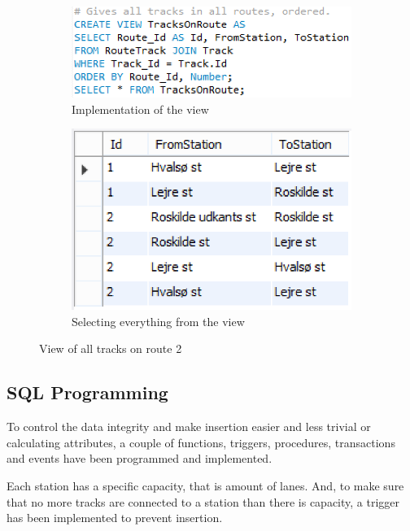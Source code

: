 \begin{figure}[h]
    \centering
    \begin{subfigure}[b]{0.45 \textwidth}
        \centering
        \includegraphics[width=\textwidth]{img/TracksOnRoute}
        \caption{Implementation of the view}
    \end{subfigure}
    \begin{subfigure}[b]{0.45 \textwidth}
        \centering
        \includegraphics{img/RouteView}
        \caption{Selecting everything from the view}
    \end{subfigure}
    \caption{View of all tracks on route 2}
    \label{fig:route}
\end{figure}

\subsection{SQL Programming}
To control the data integrity and make insertion easier and less trivial or 
calculating attributes, a couple of functions, triggers, procedures, 
transactions and events have been programmed and implemented.

Each station has a specific capacity, that is amount of lanes. And, to make 
sure that no more tracks are connected to a station than there is capacity, a 
trigger has been implemented to prevent insertion.

